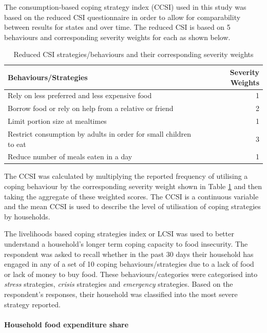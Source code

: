 \documentclass[12pt,a4paper]{article}
\let\oldparagraph\paragraph
\renewcommand{\paragraph}[1]{\oldparagraph{#1}\mbox{}}
\begin{document}
The consumption-based coping strategy index (CCSI) used in this study was based on the reduced CSI questionnaire in order to allow for comparability between results for states and over time. The reduced CSI is based on 5 behaviours and corresponding severity weights for each as shown below.

\begin{table}[H]

\caption{\label{tab:csi1}Reduced CSI strategies/behaviours and their corresponding severity weights}
\centering
\begin{tabular}[t]{lr}
\toprule
\textbf{Behaviours/Strategies} & \textbf{Severity Weights}\\
\midrule
\rowcolor{gray!6}  Rely on less preferred and less expensive food & 1\\
Borrow food or rely on help from a relative or friend & 2\\
\rowcolor{gray!6}  Limit portion size at mealtimes & 1\\
Restrict consumption by adults in order for small children to eat & 3\\
\rowcolor{gray!6}  Reduce number of meals eaten in a day & 1\\
\bottomrule
\end{tabular}
\end{table}

The CCSI was calculated by multiplying the reported frequency of utilising a coping behaviour by the corresponding severity weight shown in Table \ref{tab:csi1} and then taking the aggregate of these weighted scores. The CCSI is a continuous variable and the mean CCSI is used to describe the level of utilisation of coping strategies by households.

The livelihoods based coping strategies index or LCSI was used to better understand a household's longer term coping capacity to food insecurity. The respondent was asked to recall whether in the past 30 days their household has engaged in any of a set of 10 coping behaviours/strategies due to a lack of food or lack of money to buy food. These behaviours/categories were categorised into \emph{stress} strategies, \emph{crisis} strategies and \emph{emergency} strategies. Based on the respondent's responses, their household was classified into the most severe strategy reported.

\hypertarget{hfes}{%
\paragraph{Household food expenditure share}\label{hfes}}
\end{document}
